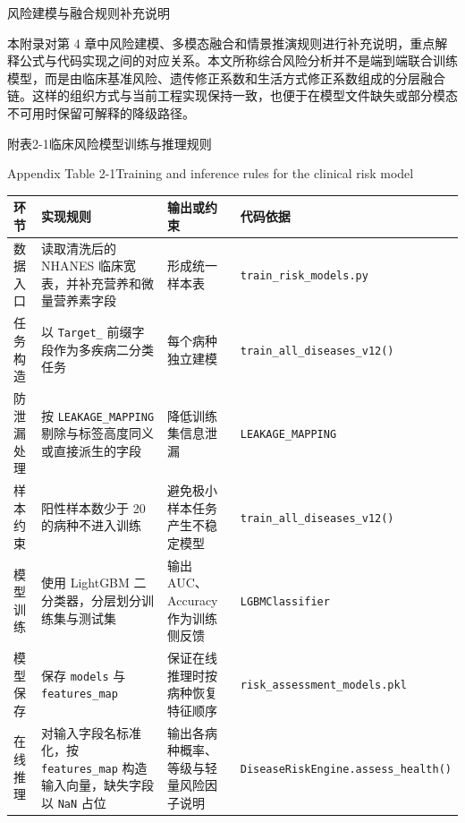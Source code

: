 \documentclass[UTF8, a4paper, 12pt, oneside]{ctexrep}
\numberwithin{equation}{chapter}
\newcommand{\codeid}[1]{{\begingroup\urlstyle{rm}\nolinkurl{#1}\endgroup}}
\begin{document}
{}
\begin{center}
{\heiti{} 风险建模与融合规则补充说明\par}
\end{center}
\vspace{0.5\baselineskip}

{
\songti{}
\onehalfspacing
\noindent 本附录对第 4 章中风险建模、多模态融合和情景推演规则进行补充说明，重点解释公式与代码实现之间的对应关系。本文所称综合风险分析并不是端到端联合训练模型，而是由临床基准风险、遗传修正系数和生活方式修正系数组成的分层融合链。这样的组织方式与当前工程实现保持一致，也便于在模型文件缺失或部分模态不可用时保留可解释的降级路径。

\vspace{0.5\baselineskip}
\begin{center}
{\songti{}附表2-1\quad 临床风险模型训练与推理规则\par}
{\rmfamily{}Appendix Table 2-1\quad Training and inference rules for the clinical risk model\par}
\end{center}
\vspace{-0.5\baselineskip}
{\songti{}
\noindent\begin{tabular}{@{}>{\raggedright\arraybackslash}p{} >{\raggedright\arraybackslash}p{} >{\raggedright\arraybackslash}p{} >{\raggedright\arraybackslash}p{}@{}}
\toprule
环节 & 实现规则 & 输出或约束 & 代码依据 \\
\midrule
数据入口 & 读取清洗后的 NHANES 临床宽表，并补充营养和微量营养素字段 & 形成统一样本表 & \codeid{train_risk_models.py} \\
任务构造 & 以 \codeid{Target_} 前缀字段作为多疾病二分类任务 & 每个病种独立建模 & \codeid{train_all_diseases_v12()} \\
防泄漏处理 & 按 \codeid{LEAKAGE_MAPPING} 剔除与标签高度同义或直接派生的字段 & 降低训练集信息泄漏 & \codeid{LEAKAGE_MAPPING} \\
样本约束 & 阳性样本数少于 20 的病种不进入训练 & 避免极小样本任务产生不稳定模型 & \codeid{train_all_diseases_v12()} \\
模型训练 & 使用 LightGBM 二分类器，分层划分训练集与测试集 & 输出 AUC、Accuracy 作为训练侧反馈 & \codeid{LGBMClassifier} \\
模型保存 & 保存 \codeid{models} 与 \codeid{features_map} & 保证在线推理时按病种恢复特征顺序 & \codeid{risk_assessment_models.pkl} \\
在线推理 & 对输入字段名标准化，按 \codeid{features_map} 构造输入向量，缺失字段以 \codeid{NaN} 占位 & 输出各病种概率、等级与轻量风险因子说明 & \codeid{DiseaseRiskEngine.assess_health()} \\
\bottomrule
\end{tabular}
}

}
\end{document}
